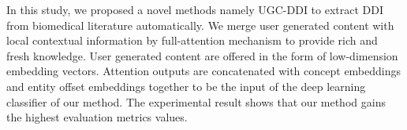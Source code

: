 \documentclass[conference]{IEEEtran}
\begin{document}
In this study, we proposed a novel methods namely UGC-DDI to extract DDI from biomedical literature automatically.
We merge user generated content with local contextual information by full-attention mechanism to provide rich and fresh knowledge.
User generated content are offered in the form of low-dimension embedding vectors.
Attention outputs are concatenated with concept embeddings and entity offset embeddings together to be the input of the deep learning classifier of our method.
The experimental result shows that our method gains the highest evaluation metrics values.



\end{document}
